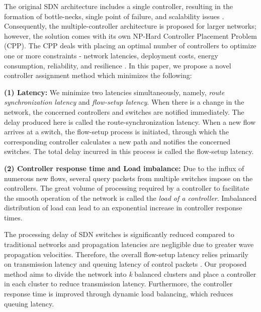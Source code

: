 \documentclass[a4paper,fleqn]{cas-dc}
\begin{document}
The original SDN architecture \cite{greene2009tr10} includes a single controller, resulting in the formation of bottle-necks, single point of failure, and scalability issues \cite{scalability2013dixit, scalability2013yeganeh}. Consequently, the multiple-controller architecture is proposed for larger networks; however, the solution comes with its own NP-Hard Controller Placement Problem (CPP). The CPP deals with placing an optimal number of controllers to optimize one or more constraints - network latencies, deployment costs, energy consumption, reliability, and resilience \cite{zhang2017survey, singh2018survey, cox2017survey}. In this paper, we propose a novel controller assignment method which minimizes the following:

	\textbf{(1) Latency:} We minimize two latencies simultaneously, namely, \textit{route synchronization latency} and \textit{flow-setup latency}. When there is a change in the network, the concerned controllers and switches are notified immediately. The delay produced here is called the route-synchronization latency. When a new flow arrives at a switch, the flow-setup process is initiated, through which the corresponding controller calculates a new path and notifies the concerned switches. The total delay incurred in this process is called the flow-setup latency.
	
	\textbf{(2) Controller response time and Load imbalance:} Due to the influx of numerous new flows, several query packets from multiple switches impose on the controllers. The great volume of processing required by a controller to facilitate the smooth operation of the network is called the \textit{load of a controller}. Imbalanced distribution of load can lead to an exponential increase in controller response times.
	
The processing delay of SDN switches is significantly reduced compared to traditional networks and propagation latencies are negligible due to greater wave propagation velocities. Therefore, the overall flow-setup latency relies primarily on transmission latency and queuing latency of control packets \cite{forouzan2006data}. Our proposed method aims to divide the network into \textit{k} balanced clusters and place a controller in each cluster to reduce transmission latency. Furthermore, the controller response time is improved through dynamic load balancing, which reduces queuing latency. 
\end{document}
